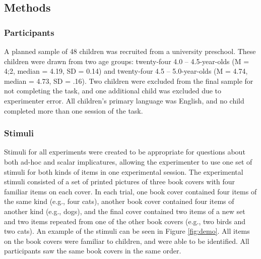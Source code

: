 \documentclass[man]{apa2}
\begin{document}

\subsection{Methods}

\subsubsection{Participants} A planned sample of 48 children was recruited from a university preschool. These children were drawn from two age groups: twenty-four 4.0 -- 4.5-year-olds (M = 4;2, median = 4.19, SD = 0.14) and twenty-four 4.5 -- 5.0-year-olds (M = 4.74, median = 4.73, SD = .16). Two children were excluded from the final sample for not completing the task, and one additional child was excluded due to experimenter error. All children's primary language was English, and no child completed more than one session of the task.  

\subsubsection{Stimuli}
Stimuli for all experiments were created to be appropriate for questions about both ad-hoc and scalar implicatures, allowing the experimenter to use one set of stimuli for both kinds of items in one experimental session. The experimental stimuli consisted of a set of printed pictures of three book covers with four familiar items on each cover. In each trial, one book cover contained four items of the same kind (e.g., four cats), another book cover contained four items of another kind (e.g., dogs), and the final cover contained two items of a new set and two items repeated from one of the other book covers (e.g., two birds and two cats). An example of the stimuli can be seen in Figure \ref{fig:demo}. All items on the book covers were familiar to children, and were able to be identified. All participants saw the same book covers in the same order. 
\end{document}
